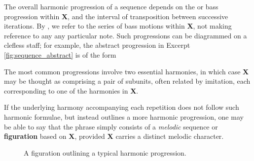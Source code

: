 The overall harmonic progression of a sequence depends on the  or  bass progression within \textbf{X}, and the interval of transposition between successive iterations. By , we refer to the series of bass motions within \textbf{X}, not making reference to any any particular note. Such progressions can be diagrammed on a clefless staff; for example, the abstract progression in Excerpt \ref{fig:sequence_abstract} is of the form
\begin{center}
   \raisebox{27.5pt}{.}
  \vspace{-10pt}
\end{center}
The most common progressions involve two essential harmonies, in which case \textbf{X} may be thought as comprising a pair of subunits, often related by imitation, each corresponding to one of the harmonies in \textbf{X}.

If the underlying harmony accompanying each repetition does not follow such harmonic formulae, but instead outlines a more  harmonic progression, one may be able to say that the phrase simply consists of a \textit{melodic} sequence or \textbf{figuration} based on \textbf{X}, provided \textbf{X} carries a distinct melodic character.
\begin{figure}[h]
  \centering
  \caption{A figuration outlining a typical harmonic progression. }
\end{figure}

